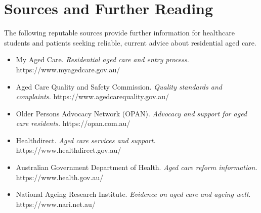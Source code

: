 \section*{Sources and Further Reading}
The following reputable sources provide further information for healthcare students and patients seeking reliable, current advice about residential aged care.

\begin{itemize}
    \item My Aged Care. \textit{Residential aged care and entry process.} https://www.myagedcare.gov.au/
    \item Aged Care Quality and Safety Commission. \textit{Quality standards and complaints.} https://www.agedcarequality.gov.au/
    \item Older Persons Advocacy Network (OPAN). \textit{Advocacy and support for aged care residents.} https://opan.com.au/
    \item Healthdirect. \textit{Aged care services and support.} https://www.healthdirect.gov.au/
    \item Australian Government Department of Health. \textit{Aged care reform information.} https://www.health.gov.au/
    \item National Ageing Research Institute. \textit{Evidence on aged care and ageing well.} https://www.nari.net.au/
\end{itemize}
